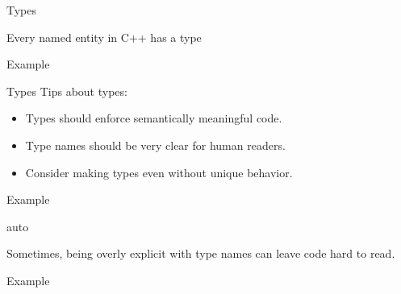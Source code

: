 \documentclass{beamer}
\begin{document}
	
	\begin{frame}{Types}
		\begin{center}
		Every named entity in C++ has a type
		\end{center}
		\bigskip
		\begin{exampleblock}{Example}
		\lstI
		\end{exampleblock}
	\end{frame}
	
	
	\begin{frame}{Types}
		Tips about types:
		\begin{itemize}
			\item Types should enforce semantically meaningful code.
			\item Type names should be very clear for human readers.
			\item Consider making types even without unique behavior.
		\end{itemize}
		\bigskip
		\begin{exampleblock}{Example}
			\lstI
		\end{exampleblock}
	\end{frame}
	
	
	\begin{frame}{auto}
		\begin{center}
			Sometimes, being overly explicit with type names can leave code hard to read.
		\end{center}
		\bigskip
		\begin{exampleblock}{Example}
			\lstI
		\end{exampleblock}
		
	\end{frame}
	
\end{document}
